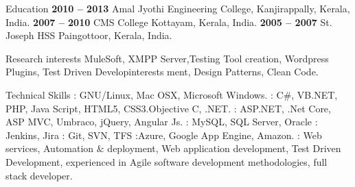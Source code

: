 \documentclass{resume}
\author{Babin Babu}
\begin{document}
\maketitle


\begin{category}{Education}
  \hfill \textbf{2010 -- 2013}
  \citemnobullet Amal Jyothi Engineering College, Kanjirappally, Kerala, India.
  \hfill \textbf{2007 -- 2010}
  \citemnobullet CMS College Kottayam, Kerala, India.
  \hfill \textbf{2005 -- 2007}
  \citemnobullet St. Joseph HSS Paingottoor, Kerala, India.
\end{category}


\begin{category}{Research interests}
  \citemnobullet MuleSoft, XMPP Server,Testing Tool creation, Wordpress Plugins, Test Driven Developinterests ment, Design Patterns, Clean Code.
\end{category}

\begin{category}{Technical Skills}
  : GNU/Linux, Mac OSX, Microsoft Windows.
  : C\#, VB.NET, PHP, Java Script, HTML5, CSS3.Objective C, .NET.
  : ASP.NET, .Net Core, ASP MVC, Umbraco, jQuery, Angular Js.
  : MySQL, SQL Server, Oracle
  :  Jenkins, Jira
  : Git, SVN, TFS
  :Azure, Google App Engine, Amazon.
  : Web services, Automation \& deployment, Web application development, Test Driven Development, experienced in Agile software development methodologies, full stack developer.
\end{category}

\end{document}
